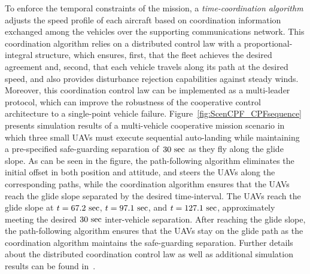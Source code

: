 \documentclass[letter,onecolumn,12pt]{aiaa-tc}
\newcommand{\1}{1_n}
\begin{document}
To enforce the temporal constraints of the mission, a \emph{time-coordination algorithm} adjusts the speed profile of each aircraft based on coordination information exchanged among the vehicles over the supporting communications network. This coordination algorithm relies on a distributed control law with a proportional-integral structure, which ensures, first, that the fleet achieves the desired agreement and, second, that each vehicle travels along its path at the desired speed, and also provides disturbance rejection capabilities against steady winds. Moreover, this coordination control law can be implemented as a multi-leader protocol, which can improve the robustness of the cooperative control architecture to a single-point vehicle failure. Figure~\ref{fig:ScenCPF_CPFsequence} presents simulation results of a multi-vehicle cooperative mission scenario in which three small UAVs must execute sequential auto-landing while maintaining a pre-specified safe-guarding separation of~$30~{\rm sec}$ as they fly along the glide slope. As can be seen in the figure, the path-following algorithm eliminates the initial offset in both position and attitude, and steers the UAVs along the corresponding paths, while the coordination algorithm ensures that the UAVs reach the glide slope separated by the desired time-interval. The UAVs reach the glide slope at ${t=67.2~{\rm sec}}$, ${t=97.1~{\rm sec}}$, and ${t=127.1~{\rm sec}}$, approximately meeting the desired $30~{\rm sec}$ inter-vehicle separation. After reaching the glide slope, the path-following algorithm ensures that the UAVs stay on the glide path as the coordination algorithm maintains the safe-guarding separation. Further details about the distributed coordination control law as well as additional simulation results can be found in~\cite{JGCD13_CPF,XargayPhd}.
\end{document}
